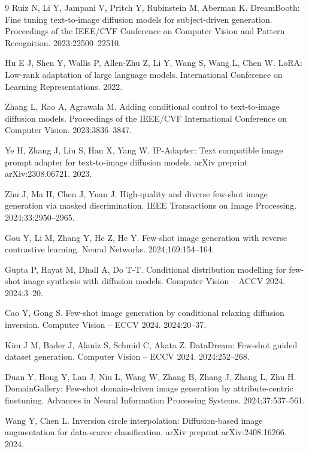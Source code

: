 \documentclass[preprint,12pt,number]{elsarticle}
\begin{document}
\begin{thebibliography}{9}
Ruiz N, Li Y, Jampani V, Pritch Y, Rubinstein M, Aberman K. DreamBooth: Fine tuning text-to-image diffusion models for subject-driven generation. Proceedings of the IEEE/CVF Conference on Computer Vision and Pattern Recognition. 2023:22500--22510.

Hu E J, Shen Y, Wallis P, Allen-Zhu Z, Li Y, Wang S, Wang L, Chen W. LoRA: Low-rank adaptation of large language models. International Conference on Learning Representations. 2022.

Zhang L, Rao A, Agrawala M. Adding conditional control to text-to-image diffusion models. Proceedings of the IEEE/CVF International Conference on Computer Vision. 2023:3836--3847.

Ye H, Zhang J, Liu S, Han X, Yang W. IP-Adapter: Text compatible image prompt adapter for text-to-image diffusion models. arXiv preprint arXiv:2308.06721. 2023.

Zhu J, Ma H, Chen J, Yuan J. High-quality and diverse few-shot image generation via masked discrimination. IEEE Transactions on Image Processing. 2024;33:2950--2965.

Gou Y, Li M, Zhang Y, He Z, He Y. Few-shot image generation with reverse contrastive learning. Neural Networks. 2024;169:154--164.

Gupta P, Hayat M, Dhall A, Do T-T. Conditional distribution modelling for few-shot image synthesis with diffusion models. Computer Vision -- ACCV 2024. 2024:3--20.

Cao Y, Gong S. Few-shot image generation by conditional relaxing diffusion inversion. Computer Vision -- ECCV 2024. 2024:20--37.

Kim J M, Bader J, Alaniz S, Schmid C, Akata Z. DataDream: Few-shot guided dataset generation. Computer Vision -- ECCV 2024. 2024:252--268.

Duan Y, Hong Y, Lan J, Niu L, Wang W, Zhang B, Zhang J, Zhang L, Zhu H. DomainGallery: Few-shot domain-driven image generation by attribute-centric finetuning. Advances in Neural Information Processing Systems. 2024;37:537--561.

Wang Y, Chen L. Inversion circle interpolation: Diffusion-based image augmentation for data-scarce classification. arXiv preprint arXiv:2408.16266. 2024.


\end{thebibliography}
\end{document}
